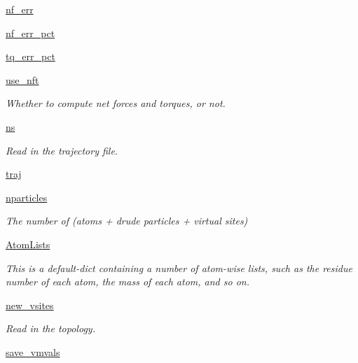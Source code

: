 \begin{DoxyCompactItemize}
\hyperlink{classforcebalance_1_1abinitio_1_1AbInitio_a6f22f2576168b879342fb60913ffc134}{nf\-\_\-err}
\item 
\hyperlink{classforcebalance_1_1abinitio_1_1AbInitio_a73def1269c075f82fe20dae6117d75bb}{nf\-\_\-err\-\_\-pct}
\item 
\hyperlink{classforcebalance_1_1abinitio_1_1AbInitio_a9954395e5bb893da066002238d7dbacd}{tq\-\_\-err\-\_\-pct}
\item 
\hyperlink{classforcebalance_1_1abinitio_1_1AbInitio_ad19dc7dc7d2593c143700182dc614435}{use\-\_\-nft}
\begin{DoxyCompactList}\small\item\em \-Whether to compute net forces and torques, or not. \end{DoxyCompactList}\item 
\hyperlink{classforcebalance_1_1abinitio_1_1AbInitio_a86f4e2b085f139886d54855f432a2672}{ns}
\begin{DoxyCompactList}\small\item\em \-Read in the trajectory file. \end{DoxyCompactList}\item 
\hyperlink{classforcebalance_1_1abinitio_1_1AbInitio_a112c4e1af07517633c5c149c07c4aa8c}{traj}
\item 
\hyperlink{classforcebalance_1_1abinitio_1_1AbInitio_ad3dfbd9d397bb7b2bbc3fe0374291e34}{nparticles}
\begin{DoxyCompactList}\small\item\em \-The number of (atoms + drude particles + virtual sites) \end{DoxyCompactList}\item 
\hyperlink{classforcebalance_1_1abinitio_1_1AbInitio_a3eceb701813ccb83d11a0dc71df835b7}{\-Atom\-Lists}
\begin{DoxyCompactList}\small\item\em \-This is a default-\/dict containing a number of atom-\/wise lists, such as the residue number of each atom, the mass of each atom, and so on. \end{DoxyCompactList}\item 
\hyperlink{classforcebalance_1_1abinitio_1_1AbInitio_abab8d9c8cbf4eddc5a3c10b6240423e6}{new\-\_\-vsites}
\begin{DoxyCompactList}\small\item\em \-Read in the topology. \end{DoxyCompactList}\item 
\hyperlink{classforcebalance_1_1abinitio_1_1AbInitio_a430661954fff8c1979eb9ac28523bb5e}{save\-\_\-vmvals}

\end{DoxyCompactItemize}
